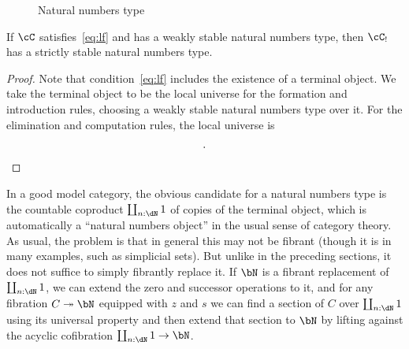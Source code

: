 \documentclass{amsart}
\let\C\cC
\def\zero{\mathsf{zero}}
\def\succ{\mathsf{succ}}
\def\nrec{\mathsf{nrec}}
\let\type\fibtype
\begin{document}
\begin{figure}
  \centering
  \caption{Natural numbers type}
  \label{fig:nno}
\end{figure}

\begin{thm}
  If $\C$ satisfies~\eqref{eq:lf} and has a weakly stable natural numbers type, then $\C_!$ has a strictly stable natural numbers type.
\end{thm}
\begin{proof}
  Note that condition~\eqref{eq:lf} includes the existence of a terminal object.
  We take the terminal object to be the local universe for the formation and introduction rules, choosing a weakly stable natural numbers type over it.
  For the elimination and computation rules, the local universe is
  \begin{align*}
    [&c: \prod x:E_{\bN}. V_C,\\
    &z: E_C(c(\zero)),\\
    &s: \prod x:E_{\bN}, y:E_C(c(x)) . E_C(c(\succ(x))) ].\qedhere
  \end{align*}
\end{proof}

In a good model category, the obvious candidate for a natural numbers type is the countable coproduct $\coprod_{n:\dN} 1$ of copies of the terminal object, which is automatically a ``natural numbers object'' in the usual sense of category theory.
As usual, the problem is that in general this may not be fibrant (though it is in many examples, such as simplicial sets).
But unlike in the preceding sections, it does not suffice to simply fibrantly replace it.
If $\bN$ is a fibrant replacement of $\coprod_{n:\dN} 1$, we can extend the zero and successor operations to it, and for any fibration $C\fib\bN$ equipped with $z$ and $s$ we can find a section of $C$ over $\coprod_{n:\dN} 1$ using its universal property and then extend that section to $\bN$ by lifting against the acyclic cofibration $\coprod_{n:\dN} 1 \to \bN$.
\end{document}
